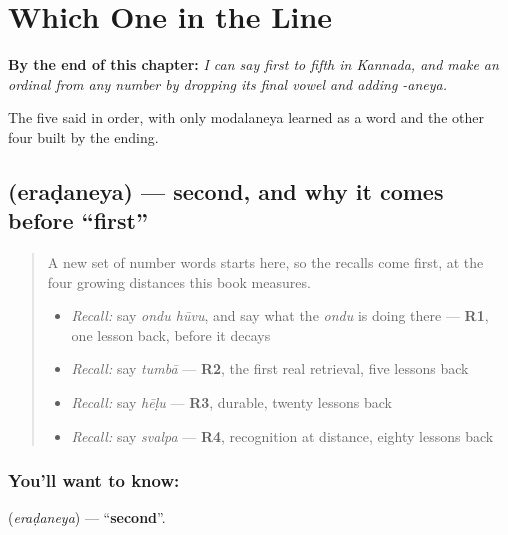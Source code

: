
\chapter{Which One in the Line}
\label{ch:ka-ordinals}

\begin{chapteropening}
\textbf{By the end of this chapter:} \emph{I can say first to fifth in Kannada, and make an ordinal from any number by dropping its final vowel and adding -aneya.}

The five said in order, with only modalaneya learned as a word and the other four built by the ending.
\end{chapteropening}

\section[\texorpdfstring{\kn{ಎರಡನೆಯ} (eraḍaneya)}{ಎರಡನೆಯ (eraḍaneya)}]{ (eraḍaneya) — second, and why it comes before \textquotedblleft{}first\textquotedblright{}}

\label{lesson:KA-C74-second}



\begin{quote}
A new set of number words starts here, so the recalls come first, at the four growing distances this book measures.

\begin{itemize}
\raggedright
  \item \emph{Recall:} say \emph{ondu hūvu}, and say what the \emph{ondu} is doing there — \textbf{R1}, one lesson back, before it decays
  \item \emph{Recall:} say \emph{tumbā} — \textbf{R2}, the first real retrieval, five lessons back
  \item \emph{Recall:} say \emph{hēḷu} — \textbf{R3}, durable, twenty lessons back
  \item \emph{Recall:} say \emph{svalpa} — \textbf{R4}, recognition at distance, eighty lessons back
\end{itemize}
\end{quote}

\subsection*{You'll want to know: }
\textbf{} (\emph{eraḍaneya}) — \textquotedblleft{}\textbf{second}\textquotedblright{}.

